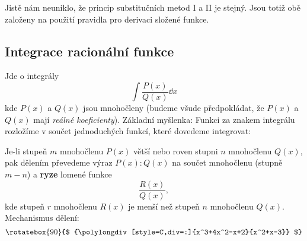 
      Jistě nám neuniklo, že princip substitučních metod I a II je stejný. Jsou totiž obě založeny 
      na použití pravidla pro derivaci složené funkce.
       
    \newpage
    \subsection{Integrace racionální funkce}
      Jde o integrály 
      \begin{equation}\label{mai:eq157}
        \int\dfrac{P(x)}{Q(x)}\dd{x}
      \end{equation}
      kde \(P(x)\) a \(Q(x)\) jsou mnohočleny (budeme všude předpokládat, že \(P(x)\) a \(Q(x)\)
      mají \emph{reálné koeficienty}). Základní myšlenka: Funkci za znakem integrálu rozložíme v
      součet jednoduchých funkcí, které dovedeme integrovat:
      
      Je-li stupeň \(m\) mnohočlenu \(P(x)\) větší nebo roven stupni \(n\) mnohočlenu \(Q(x)\), pak
      dělením převedeme výraz \(P(x):Q(x)\) na součet mnohočlenu (stupně \(m-n\)) a \textbf{ryze}
      lomené funkce
      \begin{equation}\label{mai:eq158}
        \dfrac{R(x)}{Q(x)},
      \end{equation}
      kde stupeň \(r\) mnohočlenu \(R(x)\) je menší než stupeň \(n\) mnohočlenu \(Q(x)\).
      Mechanismus dělení:
      \begin{equation*}
        \rotatebox{90}{$
          {\polylongdiv[style=C,div=:]{x^3+4x^2-x+2}{x^2+x-3}}
        $}
      \end{equation*}

